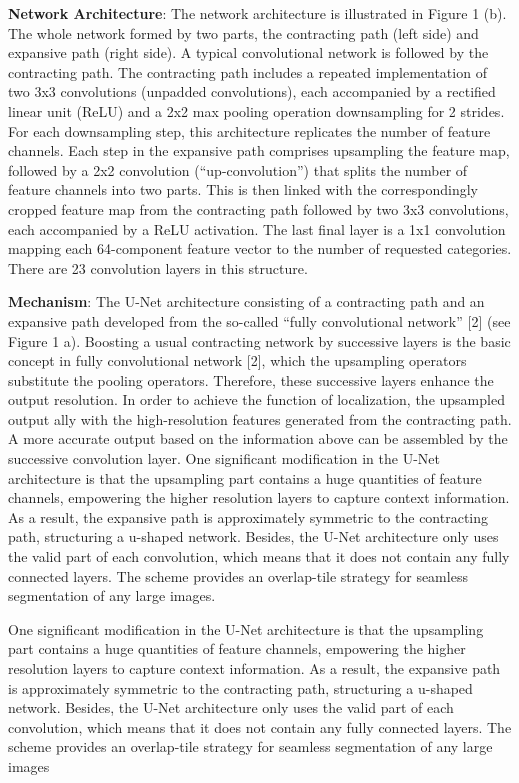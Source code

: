 \documentclass[conference]{IEEEtran}
\begin{document}
\textbf{Network Architecture}: The network architecture is illustrated in Figure 1 (b). The whole network formed by two parts, the contracting path (left side) and expansive path (right side). A typical convolutional network is followed by the contracting path. The contracting path includes a repeated implementation of two 3x3 convolutions (unpadded convolutions), each accompanied by a rectified linear unit (ReLU) and a 2x2 max pooling operation downsampling for 2 strides. For each downsampling step, this architecture replicates the number of feature channels. Each step in the expansive path comprises upsampling the feature map, followed by a 2x2 convolution (“up-convolution”) that splits the number of feature channels into two parts. This is then linked with the correspondingly cropped feature map from the contracting path followed by two 3x3 convolutions, each accompanied by a ReLU activation. The last final layer is a 1x1 convolution mapping each 64-component feature vector to the number of requested categories. There are 23 convolution layers in this structure.

\textbf{Mechanism}: The U-Net architecture consisting of a contracting path and an expansive path developed from the so-called “fully convolutional network” [2] (see Figure 1 a). Boosting a usual contracting network by successive layers is the basic concept in fully convolutional network [2], which the upsampling operators substitute the pooling operators. Therefore, these successive layers enhance the output resolution. In order to achieve the function of localization, the upsampled output ally with the high-resolution features generated from the contracting path. A more accurate output based on the information above can be assembled by the successive convolution layer.
One significant modification in the U-Net architecture is that the upsampling part contains a huge quantities of feature channels, empowering the higher resolution layers to capture context information. As a result, the expansive path is approximately symmetric to the contracting path, structuring a u-shaped network. Besides, the U-Net architecture only uses the valid part of each convolution, which means that it does not contain any fully connected layers. The scheme provides an overlap-tile strategy for seamless segmentation of any large images. 

One significant modification in the U-Net architecture is that the upsampling part contains a huge quantities of feature channels, empowering the higher resolution layers to capture context information. As a result, the expansive path is approximately symmetric to the contracting path, structuring a u-shaped network. Besides, the U-Net architecture only uses the valid part of each convolution, which means that it does not contain any fully connected layers. The scheme provides an overlap-tile strategy for seamless segmentation of any large images
\end{document}
